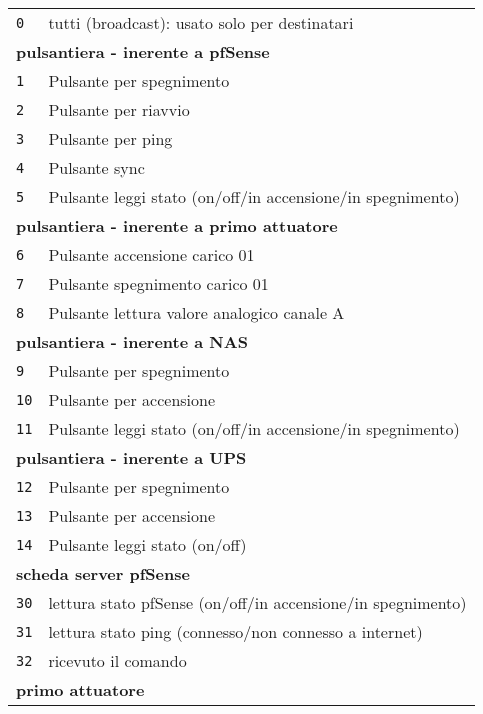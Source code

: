 \documentclass{article}
\begin{document}
        \begin{tabular}{ll}
            \texttt{0} & tutti (broadcast): usato solo per destinatari\\
            \multicolumn{2}{l}{\textbf{pulsantiera - inerente a pfSense}}\\
            \texttt{1} & Pulsante per spegnimento\\
            \texttt{2} & Pulsante per riavvio\\
            \texttt{3} & Pulsante per ping \\
            \texttt{4} & Pulsante sync \\
            \texttt{5} & Pulsante leggi stato (on/off/in accensione/in spegnimento)\\
            \multicolumn{2}{l}{\textbf{pulsantiera - inerente a primo attuatore}}\\
            \texttt{6} & Pulsante accensione carico 01\\
            \texttt{7} & Pulsante spegnimento carico 01\\
            \texttt{8} & Pulsante lettura valore analogico canale A\\
			\multicolumn{2}{l}{\textbf{pulsantiera - inerente a NAS}}\\
			\texttt{9} & Pulsante per spegnimento\\
			\texttt{10} & Pulsante per accensione\\
			\texttt{11} & Pulsante leggi stato (on/off/in accensione/in spegnimento)\\
			\multicolumn{2}{l}{\textbf{pulsantiera - inerente a UPS}}\\
			\texttt{12} & Pulsante per spegnimento\\
			\texttt{13} & Pulsante per accensione\\
			\texttt{14} & Pulsante leggi stato (on/off)\\			
            \multicolumn{2}{l}{\textbf{scheda server pfSense}}\\
            \texttt{30} & lettura stato pfSense (on/off/in accensione/in spegnimento)\\        
            \texttt{31} & lettura stato ping (connesso/non connesso a internet)\\            
            \texttt{32} & ricevuto il comando\\
            \multicolumn{2}{l}{\textbf{primo attuatore}}\\

\end{tabular}
\end{document}
